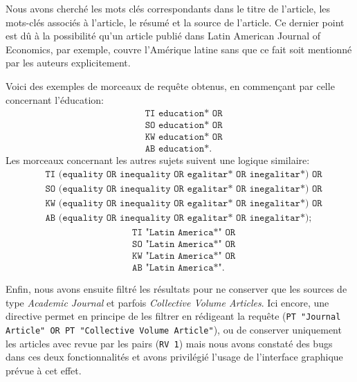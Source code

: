 \documentclass[pagesize, twoside=off, bibliography=totoc, DIV=calc, fontsize=12pt, a4paper, french]{scrartcl}
\begin{document}
Nous avons cherché les mots clés correspondants dans le titre de l’article, les mots-clés associés à l’article, le résumé et la source de l’article. Ce dernier point est dû à la possibilité qu’un article publié dans Latin American Journal of Economics, par exemple, couvre l’Amérique latine sans que ce fait soit mentionné par les auteurs explicitement.

Voici des exemples de morceaux de requête obtenus, en commençant par celle concernant l’éducation:
\begin{equation}
  \label{eq:education}
  \left.\begin{aligned}
    &\texttt{TI education* OR}\\ 
    &\texttt{SO education* OR}\\ 
    &\texttt{KW education* OR}\\ 
    &\texttt{AB education*}.
  \end{aligned}\right.
\end{equation}
Les morceaux concernant les autres sujets suivent une logique similaire:
\begin{equation}
  \label{eq:equality}
  \left.\begin{aligned}
    &\texttt{TI (equality OR inequality OR egalitar* OR inegalitar*) OR}\\ 
    &\texttt{SO (equality OR inequality OR egalitar* OR inegalitar*) OR}\\ 
    &\texttt{KW (equality OR inequality OR egalitar* OR inegalitar*) OR}\\ 
    &\texttt{AB (equality OR inequality OR egalitar* OR inegalitar*)};
  \end{aligned}\right.
\end{equation}
\begin{equation}
  \label{eq:latin}
  \left.\begin{aligned}
    &\texttt{TI "Latin America*" OR}\\ 
    &\texttt{SO "Latin America*" OR}\\ 
    &\texttt{KW "Latin America*" OR}\\ 
    &\texttt{AB "Latin America*"}.
  \end{aligned}\right.
\end{equation}

Enfin, nous avons ensuite filtré les résultats pour ne conserver que les sources de type \emph{Academic Journal} et parfois \emph{Collective Volume Articles}. Ici encore, une directive permet en principe de les filtrer en rédigeant la requête (\texttt{PT "Journal Article" OR PT "Collective Volume Article"}), ou de conserver uniquement les articles avec revue par les pairs (\texttt{RV 1}) mais nous avons constaté des bugs dans ces deux fonctionnalités et avons privilégié l’usage de l’interface graphique prévue à cet effet.
\end{document}
